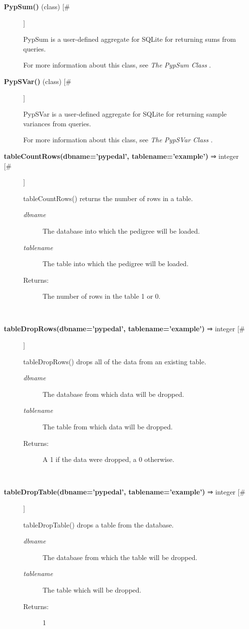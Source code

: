 \documentclass[10pt]{article}
\begin{document}
\begin{description}
\item[\textbf{PypSum()}
 (class) [\#]]

 PypSum is a user-defined aggregate for SQLite for returning sums from queries.


 For more information about this class, see \emph{The PypSum Class}
.

\item[\textbf{PypSVar()}
 (class) [\#]]

 PypSVar is a user-defined aggregate for SQLite for returning sample variances from queries.


 For more information about this class, see \emph{The PypSVar Class}
.

\item[\textbf{tableCountRows(dbname='pypedal', tablename='example')}
 ⇒ integer [\#]]

 tableCountRows() returns the number of rows in a table.
\begin{description}
\item[\emph{dbname}
] The database into which the pedigree will be loaded.
\item[\emph{tablename}
] The table into which the pedigree will be loaded.
\item[Returns:] The number of rows in the table 1 or 0.

\end{description}
\\ 

\item[\textbf{tableDropRows(dbname='pypedal', tablename='example')}
 ⇒ integer [\#]]

 tableDropRows() drops all of the data from an existing table.
\begin{description}
\item[\emph{dbname}
] The database from which data will be dropped.
\item[\emph{tablename}
] The table from which data will be dropped.
\item[Returns:] A 1 if the data were dropped, a 0 otherwise.

\end{description}
\\ 

\item[\textbf{tableDropTable(dbname='pypedal', tablename='example')}
 ⇒ integer [\#]]

 tableDropTable() drops a table from the database.
\begin{description}
\item[\emph{dbname}
] The database from which the table will be dropped.
\item[\emph{tablename}
] The table which will be dropped.
\item[Returns:] 1


\end{description}
\end{description}
\end{document}
